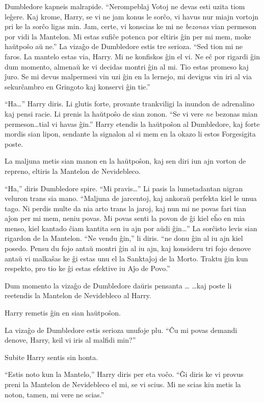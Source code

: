 Dumbledore kapneis malrapide. ``Nerompeblaj Votoj ne devas esti uzita
tiom leĝere. Kaj krome, Harry, se vi ne jam konus le sorĉo, vi havus
nur miajn vortojn pri ke la sorĉo ligas min. Jam, certe, vi konscias
ke mi ne \emph{bezonas} vian permeson por vidi la Mantelon. Mi estas
sufiĉe potenca por eltiris ĝin per mi mem, moke haŭtpoŝo aŭ ne.'' La
vizaĝo de Dumbledore estis tre serioza. ``Sed tion mi ne faros. La
mantelo estas via, Harry. Mi ne konfiskos ĝin el vi. Ne eĉ por rigardi
ĝin dum momento, almenaŭ ke vi decidas montri ĝin al mi. Tio estas
promeso kaj ĵuro. Se mi devus malpermesi vin uzi ĝin en la lernejo, mi
devigus vin iri al via sekurĉambro en Gringoto kaj konservi ĝin
tie.''

``Ha\ldots'' Harry diris. Li glutis forte, provante trankviligi la
inundon de adrenalino kaj pensi racie. Li prenis la haŭtpoŝo de sian
zonon. ``Se vi vere \emph{ne} bezonas mian permeson\ldots tial vi
havas ĝin.'' Harry etendis la haŭtpoŝon al Dumbledore, kaj forte
mordis sian lipon, sendante la signalon al si mem en la okazo li estos
Forgesigita poste.

La maljuna metis sian manon en la haŭtpoŝon, kaj sen diri iun ajn
vorton de repreno, eltiris la Mantelon de Nevidebleco.

``Ha,'' diris Dumbledore spire. ``Mi pravis\ldots'' Li pasis la
lumetadantan nigran veluron trans sia mano. ``Maljuna de jarcentoj,
kaj ankoraŭ perfekta kiel le unua tago. Ni perdis multe da nia arto
trans la jaroj, kaj nun mi ne povas fari tian aĵon per mi mem, neniu
povas. Mi povas senti la povon de ĝi kiel eĥo en mia menso, kiel
kantado ĉiam kantita sen iu ajn por aŭdi ĝin\ldots'' La sorĉisto levis
sian rigardon de la Mantelon. ``Ne vendu ĝin,'' li diris. ``ne donu
ĝin al iu ajn kiel posedo. Pensu du fojo antaŭ montri ĝin al iu ajn,
kaj konsideru tri fojo denove antaŭ vi malkaŝas ke ĝi estas unu el la
Sanktaĵoj de la Morto. Traktu ĝin kun respekto, pro tio ke ĝi estas
efektive iu Aĵo de Povo.''

Dum momento la vizaĝo de Dumbledore daŭris pensanta \ldots
\ldots kaj poste li reetendis la Mantelon de Nevidebleco al Harry.

Harry remetis ĝin en sian haŭtpoŝon.

La vizaĝo de Dumbledore estis serioza unufoje plu. ``Ĉu mi povas
demandi denove, Harry, keil vi iris al malfidi min?''

Subite Harry sentis sin honta.

``Estis noto kun la Mantelo,'' Harry diris per eta voĉo. ``Ĝi diris ke
vi provus preni la Mantelon de Nevidebleco el mi, se vi scius. Mi ne
scias kiu metis la noton, tamen, mi vere ne scias.''

